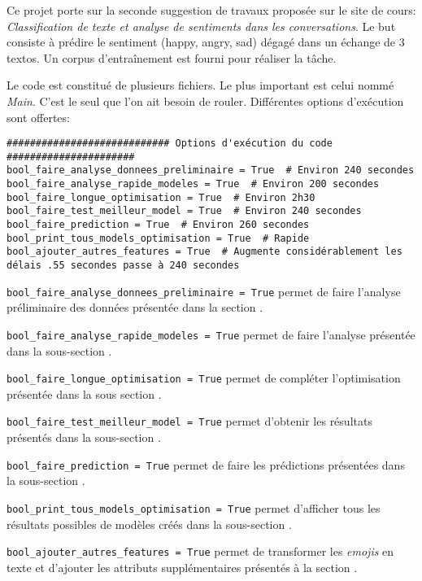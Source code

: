 Ce projet porte sur la seconde suggestion de travaux proposée sur le site de cours: \emph{ Classification de texte et analyse de sentiments dans les conversations}. Le but consiste à prédire le sentiment (happy, angry, sad) dégagé dans un échange de 3 textos. Un corpus d'entraînement est fourni pour réaliser la tâche. 

Le code est constitué de plusieurs fichiers. Le plus important est celui nommé \emph{Main}. C'est le seul que l'on ait besoin de rouler. Différentes options d'exécution sont offertes:


\begin{verbatim}
############################ Options d'exécution du code ######################
bool_faire_analyse_donnees_preliminaire = True  # Environ 240 secondes
bool_faire_analyse_rapide_modeles = True  # Environ 200 secondes
bool_faire_longue_optimisation = True  # Environ 2h30
bool_faire_test_meilleur_model = True  # Environ 240 secondes
bool_faire_prediction = True  # Environ 260 secondes
bool_print_tous_models_optimisation = True  # Rapide
bool_ajouter_autres_features = True  # Augmente considérablement les délais .55 secondes passe à 240 secondes
\end{verbatim}

%

\verb|bool_faire_analyse_donnees_preliminaire = True| permet de faire l'analyse préliminaire des données présentée dans la section . 

\verb|bool_faire_analyse_rapide_modeles = True| permet de faire l'analyse présentée dans la sous-section . 

\verb|bool_faire_longue_optimisation = True| permet de compléter l'optimisation présentée dans la sous section . 

\verb|bool_faire_test_meilleur_model = True| permet d'obtenir les résultats présentés dans la sous-section . 

\verb|bool_faire_prediction = True| permet de faire les prédictions présentées dans la sous-section . 

\verb|bool_print_tous_models_optimisation = True| permet d'afficher tous les résultats possibles de modèles créés dans la sous-section .

\verb|bool_ajouter_autres_features = True| permet de transformer les \emph{emojis} en texte et d'ajouter les attributs supplémentaires présentés à la section .